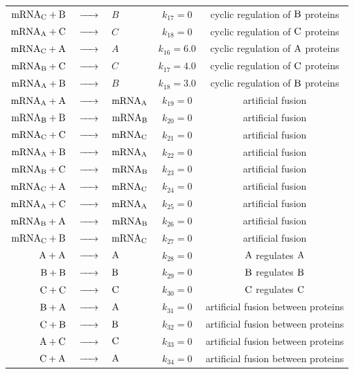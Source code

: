 \documentclass[oneside, abstracton, titlepage]{scrartcl}
\begin{document}
\begin{table}[h]
{\begin{tabular}{rclcc}
				$\ce{mRNA_C + B}$ &$\ce{->}$& $B$ & $k_{17} = 0$ & cyclic regulation of $\ce{B}$ proteins\\
				$\ce{mRNA_A + C}$ &$\ce{->}$& $C$ & $k_{18} = 0$ & cyclic regulation of $\ce{C}$ proteins\\
				$\ce{mRNA_C + A}$ &$\ce{->}$& $A$ & $k_{16} = 6.0$ & cyclic regulation of $\ce{A}$ proteins\\
				$\ce{mRNA_B + C}$ &$\ce{->}$& $C$ & $k_{17} = 4.0$ & cyclic regulation of $\ce{C}$ proteins\\
				$\ce{mRNA_A + B}$ &$\ce{->}$& $B$ & $k_{18} = 3.0$ & cyclic regulation of $\ce{B}$ proteins\\
				$\ce{mRNA_A + A}$ &$\ce{->}$& $\ce{mRNA_A}$ & $k_{19} = 0$ & artificial fusion\\
				$\ce{mRNA_B + B}$ &$\ce{->}$& $\ce{mRNA_B}$ & $k_{20} = 0$ & artificial fusion\\
				$\ce{mRNA_C + C}$ &$\ce{->}$& $\ce{mRNA_C}$ & $k_{21} = 0$ & artificial fusion\\
				$\ce{mRNA_A + B}$ &$\ce{->}$& $\ce{mRNA_A}$ & $k_{22} = 0$ & artificial fusion\\
				$\ce{mRNA_B + C}$ &$\ce{->}$& $\ce{mRNA_B}$ & $k_{23} = 0$ & artificial fusion\\
				$\ce{mRNA_C + A}$ &$\ce{->}$& $\ce{mRNA_C}$ & $k_{24} = 0$ & artificial fusion\\
				$\ce{mRNA_A + C}$ &$\ce{->}$& $\ce{mRNA_A}$ & $k_{25} = 0$ & artificial fusion\\
				$\ce{mRNA_B + A}$ &$\ce{->}$& $\ce{mRNA_B}$ & $k_{26} = 0$ & artificial fusion\\
				$\ce{mRNA_C + B}$ &$\ce{->}$& $\ce{mRNA_C}$ & $k_{27} = 0$ & artificial fusion\\
				$\ce{A + A}$ &$\ce{->}$& $\ce{A}$ & $k_{28} = 0$ & $\ce{A}$ regulates $\ce{A}$\\
				$\ce{B + B}$ &$\ce{->}$& $\ce{B}$ & $k_{29} = 0$ & $\ce{B}$ regulates $\ce{B}$\\
				$\ce{C + C}$ &$\ce{->}$& $\ce{C}$ & $k_{30} = 0$ & $\ce{C}$ regulates $\ce{C}$\\
				$\ce{B + A}$ &$\ce{->}$& $\ce{A}$ & $k_{31} = 0$ & artificial fusion between proteins\\
				$\ce{C + B}$ &$\ce{->}$& $\ce{B}$ & $k_{32} = 0$ & artificial fusion between proteins\\
				$\ce{A + C}$ &$\ce{->}$& $\ce{C}$ & $k_{33} = 0$ & artificial fusion between proteins\\
				$\ce{C + A}$ &$\ce{->}$& $\ce{A}$ & $k_{34} = 0$ & artificial fusion between proteins\\

\end{tabular}}
\end{table}
\end{document}
